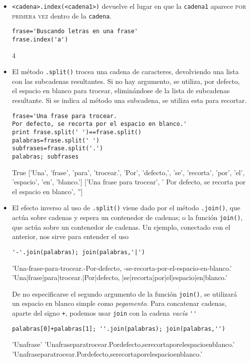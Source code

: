\begin{itemize}
\item \lstinline|<cadena>.index(<cadena1>)| devuelve el lugar en  que la
\lstinline|cadena1|  aparece \textsc{por primera vez} dentro de la
\lstinline|cadena|.
\begin{lstlisting}
frase='Buscando letras en una frase'
frase.index('a')
\end{lstlisting}
\begin{Output}
	4
\end{Output}

\item El método \lstinline|.split()| trocea una cadena de caracteres,
devolviendo una
lista con las subcadenas resultantes. Si no hay argumento, se
utiliza, por defecto, el espacio en blanco para trocear, eliminándose de la
lista de
subcadenas resultante. Si se indica al método una subcadena, se utiliza esta
para
recortar.
\begin{lstlisting}[showstringspaces=true]
frase='Una frase para trocear. 
Por defecto, se recorta por el espacio en blanco.'
print frase.split(' ')==frase.split()
palabras=frase.split(' ')
subfrases=frase.split('.')
palabras; subfrases
\end{lstlisting}
\begin{Output}
	True
	['Una', 'frase', 'para', 'trocear.', 'Por', 'defecto,', 'se',
'recorta', 
	'por', 'el', 'espacio', 'en', 'blanco.']
	['Una frase para trocear', ' Por defecto, se recorta por el espacio en
	blanco', '']
\end{Output}

\item El efecto inverso al uso de \lstinline|.split()| viene dado por el método
\lstinline|.join()|, que actúa sobre cadenas y espera un contenedor de cadenas;
o la
función \lstinline|join()|, que actúa sobre un contenedor de cadenas. Un
ejemplo,
conectado con el anterior, nos sirve para entender el uso
\begin{lstlisting}
'-'.join(palabras); join(palabras,'|')
\end{lstlisting}
\begin{Output}
	'Una-frase-para-trocear.-Por-defecto,
-se-recorta-por-el-espacio-en-blanco.'
	'Una|frase|para|trocear.|Por|defecto,
|se|recorta|por|el|espacio|en|blanco.'
\end{Output}
De no especificarse el segundo argumento de la función \lstinline|join()|, se
utilizará
un espacio en blanco simple como \emph{pegamento}. Para concatenar cadenas,
aparte del
signo \lstinline|+|, podemos usar \lstinline|join| con la cadena \emph{vacía}
\lstinline|''|
\begin{lstlisting}
palabras[0]+palabras[1]; ''.join(palabras); join(palabras,'') 
\end{lstlisting}
\begin{Output}
	'Unafrase'
	'Unafraseparatrocear.Pordefecto,serecortaporelespacioenblanco.'
	'Unafraseparatrocear.Pordefecto,serecortaporelespacioenblanco.'
\end{Output}


\end{itemize}
